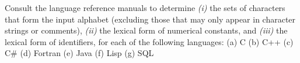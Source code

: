 \begin{exercise}\label{ex:030301}
    Consult the language reference manuals to determine \textit{(i)} the sets of 
    characters that form the input alphabet (excluding those that may only appear 
    in character strings or comments), \textit{(ii)} the lexical form of 
    numerical constants, and \textit{(iii)} the lexical form of identifiers, for 
    each of the following languages: (a) C (b) C++ (c) C\# (d) Fortran (e) Java 
    (f) Lisp (g) SQL
\end{exercise}
